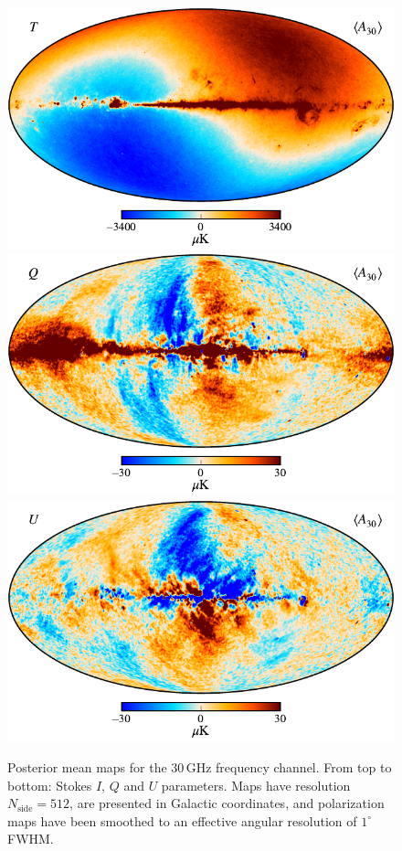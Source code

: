 \documentclass[twocolumn]{aa}
\begin{document}
\begin{figure}[p]
  \center
  \includegraphics[width=12cm]{figs/BP_030_n0512_v2_I_MEAN_w12_n512_cb_c-planck.pdf}\\
  \includegraphics[width=12cm]{figs/BP_030_n0512_v2_Q_MEAN_w12_n512_60arcmin_cb_c-planck.pdf}\\
  \includegraphics[width=12cm]{figs/BP_030_n0512_v2_U_MEAN_w12_n512_60arcmin_cb_c-planck.pdf}
  \caption{Posterior mean maps for the 30\,GHz frequency channel. From top to bottom: Stokes $I$, $Q$ and $U$ parameters. Maps have resolution $N_{\mathrm{side}} = 512$, are presented in Galactic coordinates, and polarization maps have been smoothed to an effective angular resolution of $1^\circ$ FWHM.}\label{fig:freq_maps30}
\end{figure}
\end{document}
